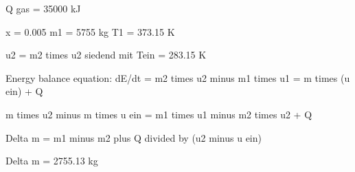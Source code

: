 Q gas = 35000 kJ  

x = 0.005  
m1 = 5755 kg  
T1 = 373.15 K  

u2 = m2 times u2  
siedend mit Tein = 283.15 K  

Energy balance equation:  
dE/dt = m2 times u2 minus m1 times u1 = m times (u ein) + Q  

m times u2 minus m times u ein = m1 times u1 minus m2 times u2 + Q  

Delta m = m1 minus m2 plus Q divided by (u2 minus u ein)  

Delta m = 2755.13 kg